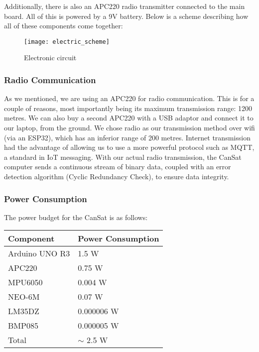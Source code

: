 Additionally, there is also an APC220 radio transmitter connected to the main board. All of this is powered by a 9V battery. Below is a scheme describing how all of these components come together:

\begin{figure}[H]
\centering
\texttt{[image: electric\_scheme]}
\caption{Electronic circuit}
\end{figure}

\subsubsection{Radio Communication}

As we mentioned, we are using an APC220 for radio communication. This is for a couple of reasons, most importantly being its maximum transmission range: 1200 metres. We can also buy a second APC220 with a USB adaptor and connect it to our laptop, from the ground. We chose radio as our transmission method over wifi (via an ESP32), which has an inferior range of 200 metres. Internet transmission had the advantage of allowing us to use a more powerful protocol such as MQTT, a standard in IoT messaging. With our actual radio transmission, the CanSat computer sends a continuous stream of binary data, coupled with an error detection algorithm (Cyclic Redundancy Check), to ensure data integrity.

\subsubsection{Power Consumption}

The power budget for the CanSat is as follows:

\begin{table}[H]
\centering
\begin{tabularx}{\textwidth}{|X|X|}
\hline
Component           & Power Consumption \\ \hline
Arduino UNO R3      & 1.5 W             \\
APC220              & 0.75 W            \\
MPU6050             & 0.004 W           \\
NEO-6M              & 0.07 W            \\
LM35DZ              & 0.000006 W        \\
BMP085              & 0.000005 W         \\ \hline
Total               & $ \sim $ 2.5 W     \\ \hline
\end{tabularx}
\end{table}

